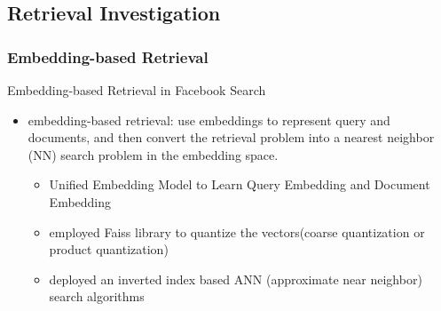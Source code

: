 \documentclass{beamer}
\begin{document}
\subsection{Retrieval Investigation}
\subsubsection{Embedding-based Retrieval}

\begin{frame}{Embedding-based Retrieval in Facebook Search}
    \begin{itemize}
    \item embedding-based retrieval: use embeddings to represent query and documents, and then convert the retrieval problem into a nearest neighbor (NN) search problem in the embedding space.
        \begin{itemize}
            \item Unified Embedding Model to Learn Query Embedding and Document Embedding
            \item employed Faiss library to quantize the vectors(coarse quantization or  product quantization)
            \item deployed an inverted index based ANN (approximate near neighbor) search algorithms
        \end{itemize}
    \end{itemize}
\end{frame}
\end{document}
